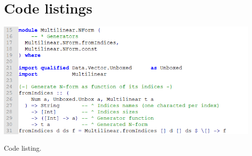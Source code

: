 
\section{Code listings}
\lipsum[10]

\vspace*{5mm}
\noindent\includegraphics[width=\linewidth]{img/code.png}
\begin{center}Code listing.\end{center}

\lipsum[11-12]
